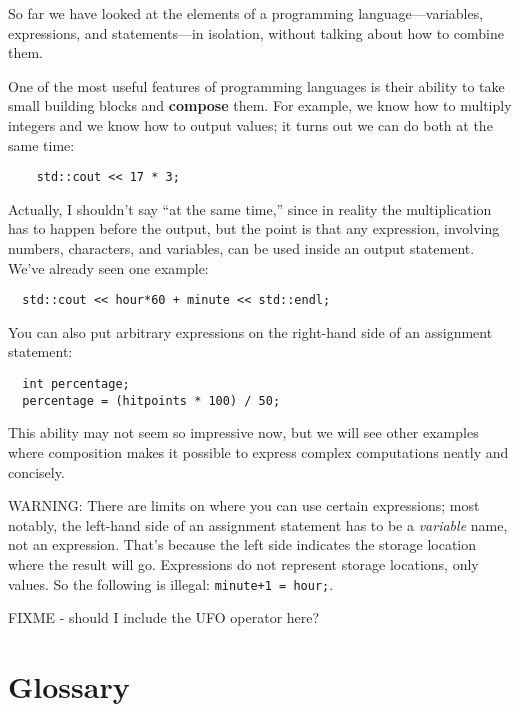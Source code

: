 So far we have looked at the elements of a programming
language---variables, expressions, and statements---in
isolation, without talking about how to combine them.

One of the most useful features of programming languages
is their ability to take small building blocks and
{\bf compose} them.  For example, we know how to multiply
integers and we know how to output values; it turns out we can
do both at the same time:

\begin{verbatim}
    std::cout << 17 * 3;
\end{verbatim}
%
Actually, I shouldn't say ``at the same time,'' since in reality
the multiplication has to happen before the output, but
the point is that any expression, involving numbers, characters,
and variables, can be used inside an output statement.  We've
already seen one example:

\begin{verbatim}
  std::cout << hour*60 + minute << std::endl;
\end{verbatim}
%
You can also put arbitrary expressions on the right-hand
side of an assignment statement:

\begin{lstlisting}
  int percentage;
  percentage = (hitpoints * 100) / 50;
\end{lstlisting}
%
This ability may not seem so impressive now, but we will see
other examples where composition makes it possible
to express complex computations neatly and concisely.

WARNING: There are limits on where you can use certain
expressions; most notably, the left-hand side of an assignment
statement has to be a {\em variable} name, not an expression.
That's because the left side indicates the storage location
where the result will go.  Expressions
do not represent storage locations, only values.  So the
following is illegal:  {\tt minute+1 = hour;}.

FIXME - should I include the UFO operator here?

\section{Glossary}

